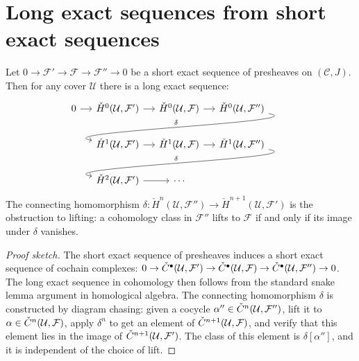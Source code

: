 \section{Long exact sequences from short exact sequences}
\label{sec:cech:les}

\begin{theorem}
\label{thm:cech-les}
Let $0 \to \mathcal{F}' \to \mathcal{F} \to \mathcal{F}'' \to 0$ be a
short exact sequence of presheaves on $(\mathcal{C}, J)$.  Then for
any cover $\mathcal{U}$ there is a long exact sequence:
\[
\begin{tikzcd}[column sep=small]
  0 \ar[r] &
  \check{H}^0(\mathcal{U}, \mathcal{F}') \ar[r] &
  \check{H}^0(\mathcal{U}, \mathcal{F}) \ar[r] &
  \check{H}^0(\mathcal{U}, \mathcal{F}'') \ar[dll, "\delta"',
    out=-10, in=170, looseness=0.7] \\
  & \check{H}^1(\mathcal{U}, \mathcal{F}') \ar[r] &
  \check{H}^1(\mathcal{U}, \mathcal{F}) \ar[r] &
  \check{H}^1(\mathcal{U}, \mathcal{F}'') \ar[dll, "\delta"',
    out=-10, in=170, looseness=0.7] \\
  & \check{H}^2(\mathcal{U}, \mathcal{F}') \ar[r] &
  \cdots &
\end{tikzcd}
\]
The connecting homomorphism $\delta : \check{H}^n(\mathcal{U}, \mathcal{F}'')
\to \check{H}^{n+1}(\mathcal{U}, \mathcal{F}')$ is the obstruction to
lifting: a cohomology class in $\mathcal{F}''$ lifts to $\mathcal{F}$
if and only if its image under $\delta$ vanishes.
\end{theorem}

\begin{proof}[Proof sketch]
The short exact sequence of presheaves induces a short exact sequence
of cochain complexes:
$0 \to \check{C}^\bullet(\mathcal{U}, \mathcal{F}') \to
\check{C}^\bullet(\mathcal{U}, \mathcal{F}) \to
\check{C}^\bullet(\mathcal{U}, \mathcal{F}'') \to 0$.
The long exact sequence in cohomology then follows from the standard
snake lemma argument in homological algebra.  The connecting
homomorphism $\delta$ is constructed by diagram chasing: given a
cocycle $\alpha'' \in \check{C}^n(\mathcal{U}, \mathcal{F}'')$, lift it
to $\alpha \in \check{C}^n(\mathcal{U}, \mathcal{F})$, apply $\delta^n$
to get an element of $\check{C}^{n+1}(\mathcal{U}, \mathcal{F})$, and
verify that this element lies in the image of
$\check{C}^{n+1}(\mathcal{U}, \mathcal{F}')$.  The class of this element
is $\delta[\alpha'']$, and it is independent of the choice of lift.
\end{proof}

